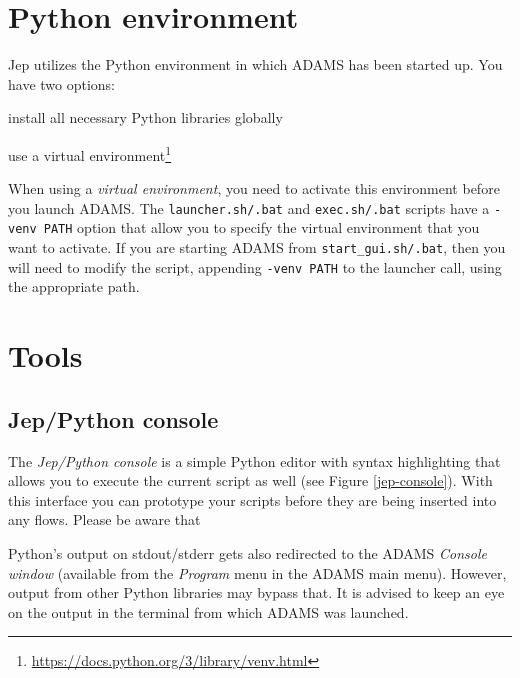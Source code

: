 \documentclass[a4paper]{book}
\begin{document}
\clearpage
\section{Python environment}
Jep utilizes the Python environment in which ADAMS has been started up. You have two options:
\begin{tight_itemize}
    \item install all necessary Python libraries globally
    \item use a virtual environment\footnote{\url{https://docs.python.org/3/library/venv.html}{}}
\end{tight_itemize}

\noindent When using a \textit{virtual environment}, you need to activate this environment before you launch
ADAMS. The \texttt{launcher.sh/.bat} and \texttt{exec.sh/.bat} scripts have a \texttt{-venv PATH}
option that allow you to specify the virtual environment that you want to activate.
If you are starting ADAMS from \texttt{start\_gui.sh/.bat}, then you will need to modify
the script, appending \texttt{-venv PATH} to the launcher call, using the appropriate path.

\clearpage
\section{Tools}
\subsection{Jep/Python console}
The \textit{Jep/Python console} is a simple Python editor with syntax highlighting that allows you
to execute the current script as well (see Figure \ref{jep-console}). With this interface you can
prototype your scripts before they are being inserted into any flows. Please be aware that

Python's output on stdout/stderr gets also redirected to the ADAMS \textit{Console window} (available
from the \textit{Program} menu in the ADAMS main menu). However, output from other Python libraries
may bypass that. It is advised to keep an eye on the output in the terminal from which ADAMS was
launched.
\end{document}
